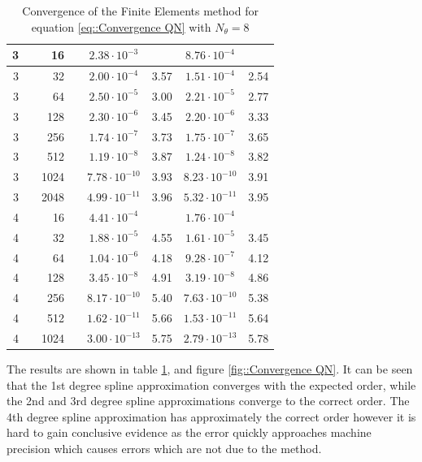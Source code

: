 \begin{table}[p]
\begin{tabular}{|r c|r c|c|c|c|c|}
\hline
 \hline
3  & &  16     & & $ 2.38 \cdot 10^{ -3 }$ &       & $ 8.76 \cdot 10^{ -4 }$ &  \\
\hline
3  & &  32     & & $ 2.00 \cdot 10^{ -4 }$ &  3.57  & $ 1.51 \cdot 10^{ -4 }$ &  2.54  \\
\hline
3  & &  64     & & $ 2.50 \cdot 10^{ -5 }$ &  3.00  & $ 2.21 \cdot 10^{ -5 }$ &  2.77  \\
\hline
3  & &  128     & & $ 2.30 \cdot 10^{ -6 }$ &  3.45  & $ 2.20 \cdot 10^{ -6 }$ &  3.33  \\
\hline
3  & &  256     & & $ 1.74 \cdot 10^{ -7 }$ &  3.73  & $ 1.75 \cdot 10^{ -7 }$ &  3.65  \\
\hline
3  & &  512     & & $ 1.19 \cdot 10^{ -8 }$ &  3.87  & $ 1.24 \cdot 10^{ -8 }$ &  3.82  \\
\hline
3  & &  1024     & & $ 7.78 \cdot 10^{ -10 }$ &  3.93  & $ 8.23 \cdot 10^{ -10 }$ &  3.91  \\
\hline
3  & &  2048     & & $ 4.99 \cdot 10^{ -11 }$ &  3.96  & $ 5.32 \cdot 10^{ -11 }$ &  3.95  \\
\hline
 \hline
4  & &  16     & & $ 4.41 \cdot 10^{ -4 }$ &       & $ 1.76 \cdot 10^{ -4 }$ &  \\
\hline
4  & &  32     & & $ 1.88 \cdot 10^{ -5 }$ &  4.55  & $ 1.61 \cdot 10^{ -5 }$ &  3.45  \\
\hline
4  & &  64     & & $ 1.04 \cdot 10^{ -6 }$ &  4.18  & $ 9.28 \cdot 10^{ -7 }$ &  4.12  \\
\hline
4  & &  128     & & $ 3.45 \cdot 10^{ -8 }$ &  4.91  & $ 3.19 \cdot 10^{ -8 }$ &  4.86  \\
\hline
4  & &  256     & & $ 8.17 \cdot 10^{ -10 }$ &  5.40  & $ 7.63 \cdot 10^{ -10 }$ &  5.38  \\
\hline
4  & &  512     & & $ 1.62 \cdot 10^{ -11 }$ &  5.66  & $ 1.53 \cdot 10^{ -11 }$ &  5.64  \\
\hline
4  & &  1024     & & $ 3.00 \cdot 10^{ -13 }$ &  5.75  & $ 2.79 \cdot 10^{ -13 }$ &  5.78  \\
\hline
 \end{tabular}
\caption{\label{tab::Convergence QN} Convergence of the Finite Elements method for equation \ref{eq::Convergence QN} with $N_\theta=8$}
\end{table}

The results are shown in table \ref{tab::Convergence QN}, and figure \ref{fig::Convergence QN}. It can be seen that the 1st degree spline approximation converges with the expected order, while the 2nd and 3rd degree spline approximations converge to the correct order. The 4th degree spline approximation has approximately the correct order however it is hard to gain conclusive evidence as the error quickly approaches machine precision which causes errors which are not due to the method.

